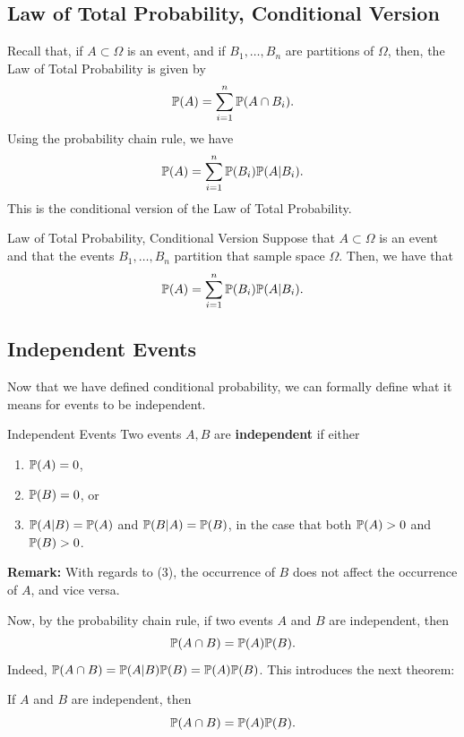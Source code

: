 \documentclass[letterpaper]{article}
\begin{document}
\subsection{Law of Total Probability, Conditional Version}
Recall that, if $A \subset \Omega$ is an event, and if $B_1, \dots, B_n$ are partitions of $\Omega$, then, the Law of Total Probability is given by  
\[\mathbb{P}(A) = \sum_{i = 1}^{n} \mathbb{P}(A \cap B_i).\]
Using the probability chain rule, we have
\[\mathbb{P}(A) = \sum_{i = 1}^{n} \mathbb{P}(B_i) \mathbb{P}(A | B_i).\]
This is the conditional version of the Law of Total Probability.
\begin{theorem}{Law of Total Probability, Conditional Version}{}
    Suppose that $A \subset \Omega$ is an event and that the events $B_1, \dots, B_n$ partition that sample space $\Omega$. Then, we have that 
    \[\mathbb{P}(A) = \sum_{i = 1}^{n} \mathbb{P}(B_i) \mathbb{P}(A | B_i).\]
\end{theorem}

\subsection{Independent Events}
Now that we have defined conditional probability, we can formally define what it means for events to be independent. 
\begin{definition}{Independent Events}{}
    Two events $A, B$ are \textbf{independent} if either 
    \begin{enumerate}
        \item $\mathbb{P}(A) = 0$, 
        \item $\mathbb{P}(B) = 0$, or 
        \item $\mathbb{P}(A | B) = \mathbb{P}(A)$ and $\mathbb{P}(B | A) = \mathbb{P}(B)$, in the case that both $\mathbb{P}(A) > 0$ and $\mathbb{P}(B) > 0$.
    \end{enumerate}
\end{definition}
\textbf{Remark:} With regards to (3), the occurrence of $B$ does not affect the occurrence of $A$, and vice versa. 

\bigskip 

Now, by the probability chain rule, if two events $A$ and $B$ are independent, then 
\[\mathbb{P}(A \cap B) = \mathbb{P}(A) \mathbb{P}(B).\]
Indeed, $\mathbb{P}(A \cap B) = \mathbb{P}(A | B) \mathbb{P}(B) = \mathbb{P}(A) \mathbb{P}(B)$. This introduces the next theorem: 
\begin{theorem}{}{}
    If $A$ and $B$ are independent, then 
    \[\mathbb{P}(A \cap B) = \mathbb{P}(A) \mathbb{P}(B).\]
\end{theorem}
\end{document}
